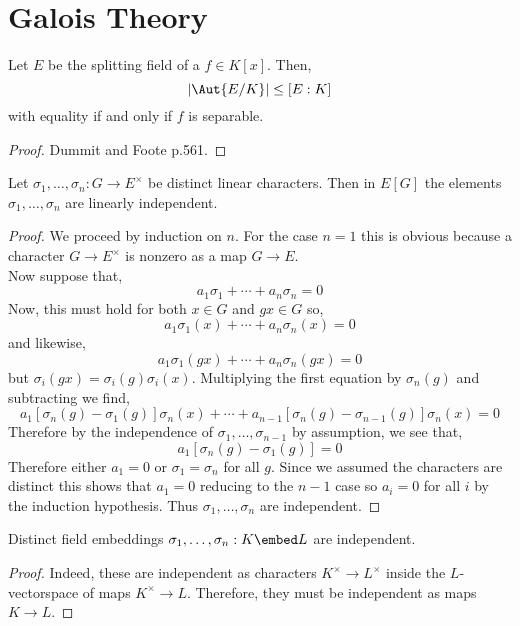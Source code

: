 \documentclass[12pt]{article}
\begin{document}
\tableofcontents



\section{Galois Theory}

\begin{prop}
Let $E$ be the splitting field of a $f \in K[x]$. Then,
\[ | \Aut{E/K} | \le [E : K ] \]
with equality if and only if $f$ is separable.
\end{prop}

\begin{proof}
Dummit and Foote p.561.
\end{proof}

\begin{lemma}
Let $\sigma_1, \dots, \sigma_n : G \to E^\times$ be distinct linear characters. Then in $E[G]$ the elements $\sigma_1, \dots, \sigma_n$ are linearly independent.
\end{lemma}

\begin{proof}
We proceed by induction on $n$. For the case $n = 1$ this is obvious because a character $G \to E^\times$ is nonzero as a map $G \to E$. 
\bigskip\\
Now suppose that,
\[ a_1 \sigma_1 + \cdots + a_n \sigma_n = 0 \]
Now, this must hold for both $x \in G$ and $g x \in G$ so,
\[ a_1 \sigma_1(x) + \cdots + a_n \sigma_n(x) = 0 \]
and likewise,
\[ a_1 \sigma_1(gx) + \cdots + a_n \sigma_n(gx) = 0 \]
but $\sigma_i(gx) = \sigma_i(g) \sigma_i(x)$. Multiplying the first equation by $\sigma_n(g)$ and subtracting we find,
\[ a_1 [\sigma_n(g) - \sigma_1(g)] \sigma_n(x) + \cdots + a_{n-1} [\sigma_n(g) - \sigma_{n-1}(g)] \sigma_n(x) = 0 \]
Therefore by the independence of $\sigma_1, \dots, \sigma_{n-1}$ by assumption, we see that,
\[ a_1 [\sigma_n(g) - \sigma_1(g)] = 0 \]
Therefore either $a_1 = 0$ or $\sigma_1 = \sigma_n$ for all $g$. Since we assumed the characters are distinct this shows that $a_1 = 0$ reducing to the $n-1$ case so $a_i = 0$ for all $i$ by the induction hypothesis. Thus $\sigma_1, \dots, \sigma_n$ are independent.
\end{proof}

\begin{cor}
Distinct field embeddings $\sigma_1, \dots, \sigma_n : K \embed L$ are independent.
\end{cor}

\begin{proof}
Indeed, these are independent as characters $K^\times \to L^\times$ inside the $L$-vectorspace of maps $K^\times \to L$. Therefore, they must be independent as maps $K \to L$.
\end{proof}
\end{document}
